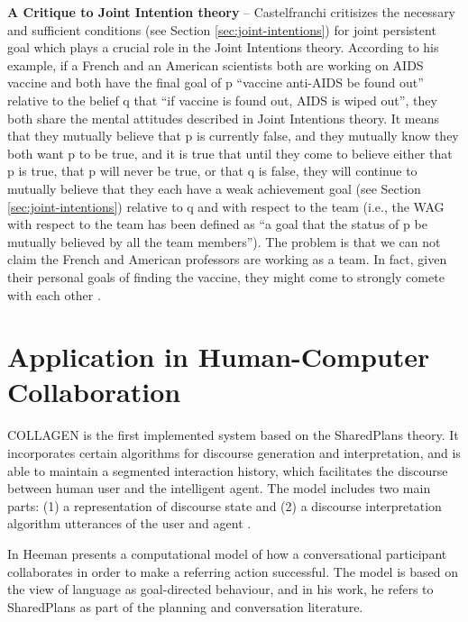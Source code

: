 \documentclass[11pt]{article}
\begin{document}
\textbf{A Critique to Joint Intention theory} -- Castelfranchi critisizes the
necessary and sufficient conditions (see Section \ref{sec:joint-intentions}) for
joint persistent goal which plays a crucial role in the Joint Intentions theory.
According to his example, if a French and an American scientists both are
working on AIDS vaccine and both have the final goal of p ``vaccine anti-AIDS be
found out'' relative to the belief q that ``if vaccine is found out, AIDS is
wiped out'', they both share the mental attitudes described in Joint Intentions
theory. It means that they mutually believe that p is currently false, and they
mutually know they both want p to be true, and it is true that until they come
to believe either that p is true, that p will never be true, or that q is false,
they will continue to mutually believe that they each have a weak achievement
goal (see Section \ref{sec:joint-intentions}) relative to q and with respect to
the team (i.e., the WAG with respect to the team has been defined as ``a goal
that the status of p be mutually  believed by all the team members''). The
problem is that we can not claim the French and American professors are working
as a team. In fact, given their personal goals of finding the vaccine, they
might come to strongly comete with each other
\cite{castelfranchi:commitments-aids}.

\section{Application in Human-Computer Collaboration}
\label{sec:applicaiton}

COLLAGEN \cite{rich:collaboration-manager,rich:discourse} is the first
implemented system based on the SharedPlans theory. It incorporates certain
algorithms for discourse generation and interpretation, and is able to maintain
a segmented interaction history, which facilitates the discourse between human
user and the intelligent agent. The model includes two main parts: (1) a
representation of discourse state and (2) a discourse interpretation algorithm
utterances of the user and agent \cite{rickel:discourse-theory-dialogue}.

In \cite{heeman:model-collaboration-referring} Heeman presents a computational
model of how a conversational participant collaborates in order to make a
referring action successful. The model is based on the view of language as
goal-directed behaviour, and in his work, he refers to SharedPlans as part of
the planning and conversation literature.
\end{document}
